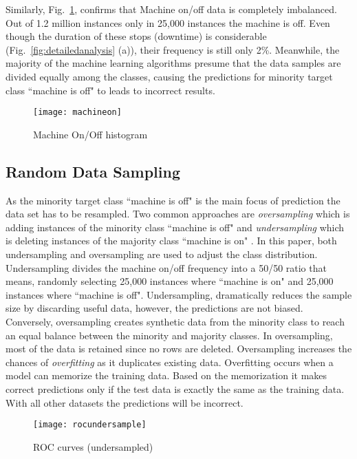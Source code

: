 \documentclass[runningheads]{llncs}
\begin{document}
Similarly, Fig.~\ref{fig:machineon2},  confirms that Machine on/off data is completely imbalanced. Out of 1.2 million instances only in 25,000 instances the machine is off. Even though the duration of these stops (downtime) is considerable (Fig.~\ref{fig:detailedanalysis} (a)), their frequency is still only 2\%. Meanwhile, the majority of the machine learning algorithms presume that the data samples are divided equally among the classes, causing the predictions for minority target class ``machine is off" to leads to incorrect results.

\begin{figure}
\centering
\texttt{[image: machineon]} 
\caption{Machine On/Off histogram}
\label{fig:machineon2}
\end{figure}





\subsection {Random Data Sampling}
\label{sec:sampling}
As the minority target class ``machine is off" is the main focus of prediction the data set has to be resampled. Two common approaches are \emph{oversampling} which is adding instances of the minority class ``machine is off" and \emph{undersampling} which is  deleting instances of the majority class ``machine is on" \cite{Gonzales}. In this paper, both undersampling and oversampling are used to adjust the class distribution. Undersampling divides the machine on/off frequency into a 50/50 ratio that means, randomly selecting 25,000 instances where ``machine is on" and 25,000 instances where ``machine is off". Undersampling, dramatically reduces the sample size by discarding useful data, however, the predictions are not biased. Conversely, oversampling creates synthetic data from the minority class to reach an equal balance between the minority and majority classes. In oversampling, most of the data is retained since no rows are deleted. Oversampling increases the chances of \emph{overfitting} as it duplicates existing data. Overfitting occurs when a model can memorize the training data. Based on the memorization it makes correct predictions only if the test data is exactly the same as the training data. With all other datasets the predictions will be incorrect. 

\begin{figure}
\centering
\texttt{[image: rocundersample]} 
\caption{ROC curves (undersampled)}
\label{fig:machineon}
\end{figure}
\end{document}
